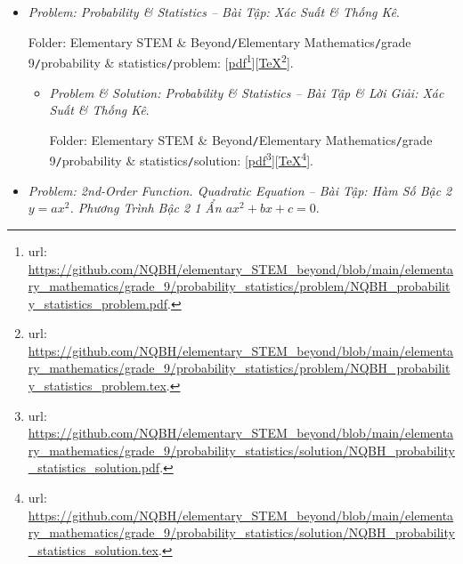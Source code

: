 \documentclass[12pt]{article}
\begin{document}
\begin{itemize}
\begin{itemize}
		Folder: {\sf Elementary STEM \& Beyond{\tt/}Elementary Mathematics{\tt/}grade 9{\tt/}circle{\tt/}solution}: [\href{https://github.com/NQBH/elementary_STEM_beyond/blob/main/elementary_mathematics/grade_9/circle/solution/NQBH_circle_solution.pdf}{pdf}\footnote{{\sc url}: \url{https://github.com/NQBH/elementary_STEM_beyond/blob/main/elementary_mathematics/grade_9/circle/solution/NQBH_circle_solution.pdf}.}][\href{https://github.com/NQBH/elementary_STEM_beyond/blob/main/elementary_mathematics/grade_9/circle/solution/NQBH_circle_solution.tex}{\TeX}\footnote{{\sc url}: \url{https://github.com/NQBH/elementary_STEM_beyond/blob/main/elementary_mathematics/grade_9/circle/solution/NQBH_circle_solution.tex}.}].
	\end{itemize}
	\item {\it Problem: Probability \& Statistics -- Bài Tập: Xác Suất \& Thống Kê}.
	
	Folder: {\sf Elementary STEM \& Beyond{\tt/}Elementary Mathematics{\tt/}grade 9{\tt/}probability \& statistics{\tt/}problem}: [\href{https://github.com/NQBH/elementary_STEM_beyond/blob/main/elementary_mathematics/grade_9/probability_statistics/problem/NQBH_probability_statistics_problem.pdf}{pdf}\footnote{{\sc url}: \url{https://github.com/NQBH/elementary_STEM_beyond/blob/main/elementary_mathematics/grade_9/probability_statistics/problem/NQBH_probability_statistics_problem.pdf}.}][\href{https://github.com/NQBH/elementary_STEM_beyond/blob/main/elementary_mathematics/grade_9/probability_statistics/problem/NQBH_probability_statistics_problem.tex}{\TeX}\footnote{{\sc url}: \url{https://github.com/NQBH/elementary_STEM_beyond/blob/main/elementary_mathematics/grade_9/probability_statistics/problem/NQBH_probability_statistics_problem.tex}.}].
	\begin{itemize}
		\item {\it Problem \& Solution: Probability \& Statistics -- Bài Tập \& Lời Giải: Xác Suất \& Thống Kê}.
		
		Folder: {\sf Elementary STEM \& Beyond{\tt/}Elementary Mathematics{\tt/}grade 9{\tt/}probability \& statistics{\tt/}solution}: [\href{https://github.com/NQBH/elementary_STEM_beyond/blob/main/elementary_mathematics/grade_9/probability_statistics/solution/NQBH_probability_statistics_solution.pdf}{pdf}\footnote{{\sc url}: \url{https://github.com/NQBH/elementary_STEM_beyond/blob/main/elementary_mathematics/grade_9/probability_statistics/solution/NQBH_probability_statistics_solution.pdf}.}][\href{https://github.com/NQBH/elementary_STEM_beyond/blob/main/elementary_mathematics/grade_9/probability_statistics/solution/NQBH_probability_statistics_solution.tex}{\TeX}\footnote{{\sc url}: \url{https://github.com/NQBH/elementary_STEM_beyond/blob/main/elementary_mathematics/grade_9/probability_statistics/solution/NQBH_probability_statistics_solution.tex}.}].
	\end{itemize}
	\item {\it Problem: 2nd-Order Function. Quadratic Equation -- Bài Tập: Hàm Số Bậc 2 $y = ax^2$. Phương Trình Bậc 2 1 Ẩn $ax^2 + bx + c = 0$}.
	

\end{itemize}
\end{document}
